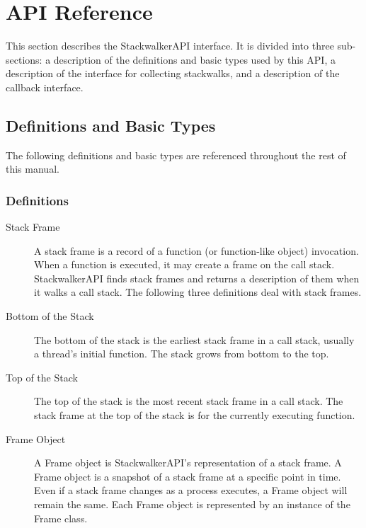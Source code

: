 \section{API Reference}
\label{sec:api}

This section describes the StackwalkerAPI interface. It is divided into three
sub-sections: a description of the definitions and basic types used by this API,
a description of the interface for collecting stackwalks, and a description of
the callback interface.

\subsection{Definitions and Basic Types}
The following definitions and basic types are referenced throughout the rest of
this manual.

\subsubsection{Definitions}
\label{subsec:definitions}
\begin{description}

\item [Stack Frame] A stack frame is a record of a function (or function-like
    object) invocation. When a function is executed, it may create a frame on
    the call stack. StackwalkerAPI finds stack frames and returns a description
    of them when it walks a call stack.  The following three definitions deal
    with stack frames.

\item [Bottom of the Stack] The bottom of the stack is the earliest stack frame
    in a call stack, usually a thread's initial function. The stack grows from
    bottom to the top.

\item [Top of the Stack] The top of the stack is the most recent stack frame in
    a call stack. The stack frame at the top of the stack is for the currently
    executing function.

\item [Frame Object] A Frame object is StackwalkerAPI's representation of a
    stack frame. A Frame object is a snapshot of a stack frame at a specific
    point in time. Even if a stack frame changes as a process executes, a Frame
    object will remain the same. Each Frame object is represented by an instance
    of the Frame class.

\end{description}

